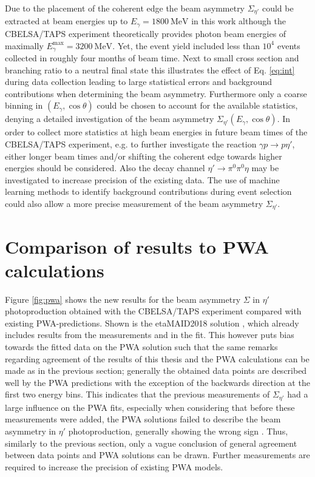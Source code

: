 Due to the placement of the coherent edge the beam asymmetry $\Sigma_{\eta'}$ could be extracted at beam energies up to $E_\gamma=\SI{1800}{\mega\eV}$ in this work although the CBELSA/TAPS experiment theoretically provides photon beam energies of maximally $E_\gamma^\text{max}=\SI{3200}{\mega\eV}$. Yet, the event yield included less than $10^4$ events collected in roughly four months of beam time. Next to small cross section and branching ratio to a neutral final state this illustrates the effect of Eq. \ref{eq:int} during data collection leading to large statistical errors and background contributions when determining the beam asymmetry. Furthermore only a coarse binning in $\left(E_\gamma,\cos\theta\right)$ could be chosen to account for the available statistics, denying a detailed investigation of the beam asymmetry $\Sigma_{\eta'}\left(E_\gamma,\cos\theta\right)$. In order to collect more statistics at high beam energies in future beam times of the CBELSA/TAPS experiment, e.g. to further investigate the reaction $\gamma p\to p\eta'$, either longer beam times and/or shifting the coherent edge towards higher energies should be considered. Also the decay channel $\eta'\to\pi^0\pi^0\eta$ may be investigated to increase precision of the existing data. The use of machine learning methods to identify background contributions during event selection \cite{ml} could also allow a more precise measurement of the beam asymmetry $\Sigma_{\eta'}$.
\section{Comparison of results to PWA calculations}
Figure \ref{fig:pwa} shows the new results for the beam asymmetry $\Sigma$ in $\eta'$ photoproduction obtained with the CBELSA/TAPS experiment compared with existing PWA-predictions. Shown is the etaMAID2018 solution \cite{etaMAID}, which already includes results from the measurements \cite{collins} and \cite{thresh} in the fit. This however puts bias towards  the fitted data on the PWA solution such that the same remarks regarding agreement of the results of this thesis and the PWA calculations can be made as in the previous section; generally the obtained data points are described well by the PWA predictions with the exception of the backwards direction at the first two energy bins. This indicates that the previous measurements of $\Sigma_{\eta'}$ had a large influence on the PWA fits, especially when considering that before these measurements were added, the PWA solutions failed to describe the beam asymmetry in $\eta'$ photoproduction, generally showing the wrong sign \cite{collins}. Thus, similarly to the previous section, only a vague conclusion of general agreement between data points and PWA solutions can be drawn. Further measurements are required to increase the precision of existing PWA models.

